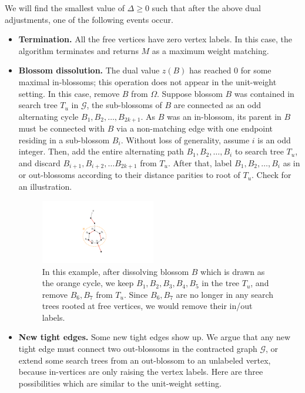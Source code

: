 We will find the smallest value of $\Delta\geq 0$ such that after the above dual adjustments, one of the following events occur.
\begin{itemize}
	\item \textbf{Termination.} All the free vertices have zero vertex labels. In this case, the algorithm terminates and returns $M$ as a maximum weight matching.
	
	\item \textbf{Blossom dissolution.} The dual value $z(B)$ has reached $0$ for some maximal in-blossoms; this operation does not appear in the unit-weight setting. In this case, remove $B$ from $\Omega$. Suppose blossom $B$ was contained in search tree $T_u$ in $\mathcal{G}$, the sub-blossoms of $B$ are connected as an odd alternating cycle $B_1, B_2, \ldots, B_{2k+1}$. As $B$ was an in-blossom, its parent in $B$ must be connected with $B$ via a non-matching edge with one endpoint residing in a sub-blossom $B_i$. Without loss of generality, assume $i$ is an odd integer. Then, add the entire alternating path $B_1, B_2, \ldots, B_i$ to search tree $T_u$, and discard $B_{i+1}, B_{i+2}, \ldots B_{2k+1}$ from $T_u$. After that, label $B_1, B_2, \ldots, B_i$ as in or out-blossoms according to their distance parities to root of $T_u$. Check  for an illustration.
	 
	\begin{figure}
		\centering
		\includegraphics[width=5cm]{fig/lecture_matching_dissolve}
		\caption{In this example, after dissolving blossom $B$ which is drawn as the orange cycle, we keep $B_1, B_2, B_3, B_4, B_5$ in the tree $T_u$, and remove $B_6, B_7$ from $T_u$. Since $B_6, B_7$ are no longer in any search trees rooted at free vertices, we would remove their in/out labels.}
		\label{fig:dissolve}
	\end{figure}
	 
	\item \textbf{New tight edges.} Some new tight edges show up. We argue that any new tight edge must connect two out-blossoms in the contracted graph $\mathcal{G}$, or extend some search trees from an out-blossom to an unlabeled vertex, because in-vertices are only raising the vertex labels. Here are three possibilities which are similar to the unit-weight setting.
	

\end{itemize}
